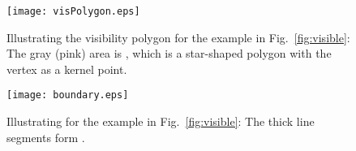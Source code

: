 \documentclass[11pt]{article}
\begin{document}
\begin{figure}[t]
\begin{minipage}[t]{\linewidth}
\begin{center}
\texttt{[image: visPolygon.eps]}
\caption{\footnotesize Illustrating the visibility polygon  
for the example in Fig.~\ref{fig:visible}: The gray (pink) area is
, which is a star-shaped polygon with the vertex  as a kernel point. 
}\label{fig:visPolygon}
\end{center}
\end{minipage}
\end{figure}

\begin{figure}[t]
\begin{minipage}[t]{\linewidth}
\begin{center}
\texttt{[image: boundary.eps]}
\caption{\footnotesize Illustrating  for the example in
Fig.~\ref{fig:visible}: The thick line segments form . 
}\label{fig:boundary}
\end{center}
\end{minipage}
\end{figure}
\end{document}
